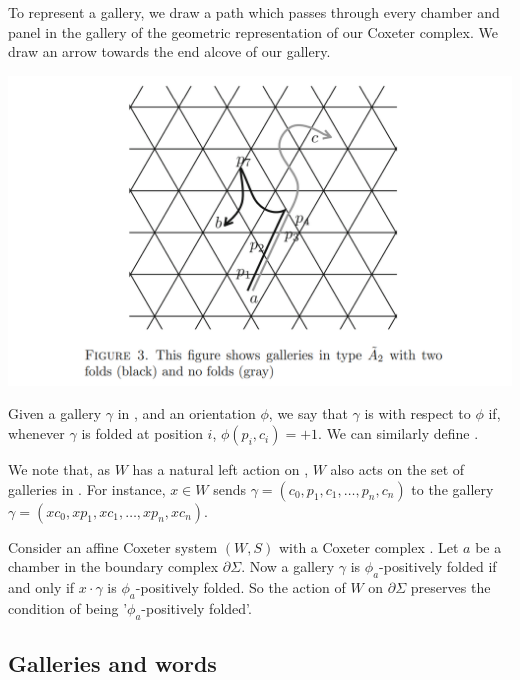 \documentclass[11pt]{article}
\begin{document}
To represent a gallery, we draw a path which passes through every chamber and panel in the gallery of the geometric representation of our Coxeter complex. We draw an arrow towards the end alcove of our gallery. 

\begin{center}
\includegraphics[scale=0.4]{Screenshot 2023-02-03 111653.png}\\
\end{center}

\begin{definition}
    Given a gallery $\gamma$ in \sg, and an orientation $\phi$, we say that $\gamma$ is  with respect to $\phi$ if, whenever $\gamma$ is folded at position $i$, $\phi(p_i,c_i)=+1$.  We can similarly define .
\end{definition}

We note that, as $W$ has a natural left action on \sg, $W$ also acts on the set of galleries in \sg. For instance, $x\in W$ sends $\gamma = (c_0,p_1,c_1,\hdots ,p_n,c_n)$ to the gallery $\gamma = (xc_0,xp_1,xc_1,\hdots ,xp_n,xc_n)$. 

\begin{lemma} 
    Consider an affine Coxeter system $(W,S)$ with a Coxeter complex \sg. Let $a$ be a chamber in the boundary complex $\partial\Sigma$. Now a gallery $\gamma$ is $\phi_a$-positively folded if and only if $x\cdot \gamma$ is $\phi_a$-positively folded. So the action of $W$ on $\partial\Sigma$ preserves the condition of being '$\phi_a$-positively folded'.
\end{lemma}

\subsection{Galleries and words}
\end{document}
